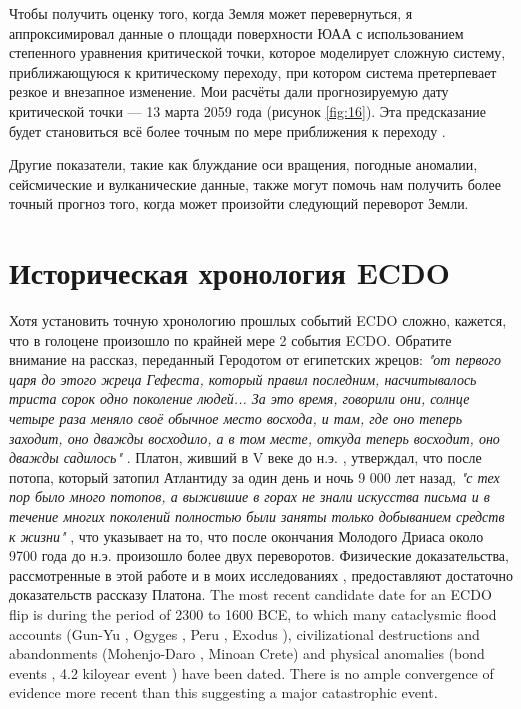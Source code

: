 \documentclass[10pt,twocolumn,letterpaper]{article}
\begin{document}
Чтобы получить оценку того, когда Земля может перевернуться, я аппроксимировал данные о площади поверхности ЮАА с использованием степенного уравнения критической точки, которое моделирует сложную систему, приближающуюся к критическому переходу, при котором система претерпевает резкое и внезапное изменение. Мои расчёты дали прогнозируемую дату критической точки — 13 марта 2059 года (рисунок \ref{fig:16}). Эта предсказание будет становиться всё более точным по мере приближения к переходу \cite{136}.

Другие показатели, такие как блуждание оси вращения, погодные аномалии, сейсмические и вулканические данные, также могут помочь нам получить более точный прогноз того, когда может произойти следующий переворот Земли.

\section{Историческая хронология ECDO}

Хотя установить точную хронологию прошлых событий ECDO сложно, кажется, что в голоцене произошло по крайней мере 2 события ECDO. Обратите внимание на рассказ, переданный Геродотом от египетских жрецов: \textit{"от первого царя до этого жреца Гефеста, который правил последним, насчитывалось триста сорок одно поколение людей... За это время, говорили они, солнце четыре раза меняло своё обычное место восхода, и там, где оно теперь заходит, оно дважды восходило, а в том месте, откуда теперь восходит, оно дважды садилось"} \cite{32}. Платон, живший в V веке до н.э. \cite{111}, утверждал, что после потопа, который затопил Атлантиду за один день и ночь 9 000 лет назад, \textit{"с тех пор было много потопов, а выжившие в горах не знали искусства письма и в течение многих поколений полностью были заняты только добыванием средств к жизни"} \cite{112}, что указывает на то, что после окончания Молодого Дриаса около 9700 года до н.э. произошло более двух переворотов. Физические доказательства, рассмотренные в этой работе и в моих исследованиях \cite{2}, предоставляют достаточно доказательств рассказу Платона.
The most recent candidate date for an ECDO flip is during the period of 2300 to 1600 BCE, to which many cataclysmic flood accounts (Gun-Yu \cite{113,114,115}, Ogyges \cite{116,117}, Peru \cite{118,119}, Exodus \cite{120}), civilizational destructions and abandonments (Mohenjo-Daro \cite{121}, Minoan Crete\cite{100,101}) and physical anomalies (bond events \cite{122}, 4.2 kiloyear event \cite{90}) have been dated. There is no ample convergence of evidence more recent than this suggesting a major catastrophic event.
\end{document}
